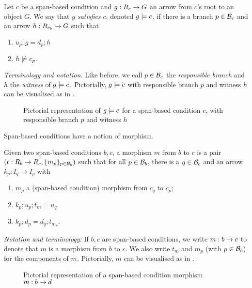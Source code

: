 \begin{definition}
  Let $c$ be a span-based condition and $g:R_c\rightarrow G$ an arrow from $c$'s root to an object $G$. We say that \emph{$g$ satisfies $c$}, denoted $g\models c$, if there is a branch $p\in \mathcal{B}_c$ and an arrow $h:R_{c_b}\rightarrow G$ such that
  \begin{enumerate}
  \item $u_p;g=d_p;h$
  \item $h\not\models c_p$.
  \end{enumerate}
\end{definition}
%
\emph{Terminology and notation.} Like before, we call $p\in\mathcal{B}_c$ the \emph{responsible branch} and $h$ the \emph{witness} of $g\models c$. Pictorially, $g\models c$ with responsible branch $p$ and witness $h$ can be visualised as in .
%
\begin{figure}
  \centering
  
  \caption{Pictorial representation of $g\models c$ for a span-based condition $c$, with responsible branch $p$ and witness $h$}
\end{figure}

\medskip\noindent
Span-based conditions have a notion of morphism.

\begin{definition}
  Given two span-based conditions $b,c$, a morphism $m$ from $b$ to $c$ is a pair $(t:R_b\rightarrow R_c,\{{m_p}\}_{p\in \mathcal{B}_b})$ such that for all $p\in \mathcal{B}_b$, there is a $q\in \mathcal{B}_c$ and an arrow $k_p:I_q\rightarrow I_p$ with
  \begin{enumerate}
  \item $m_p$ a (span-based condition) morphism from $c_q$ to $c_p$;
  \item $k_p;u_p;t_m=u_q$.
  \item $k_p;d_p=d_q;t_{m_p}$.
  \end{enumerate}
\end{definition}
%
\emph{Notation and terminology:} If $b,c$ are span-based conditions, we write $m:b\rightarrow c$ to denote that $m$ is a morphism from $b$ to $c$. We also write $t_m$ and $m_p$ (with $p\in\mathcal{B}_b$) for the components of $m$. Pictorially, $m$ can be visualised as in .
%
\begin{figure}
  \centering
  
  \caption{Pictorial representation of a span-based condition morphism $m:b\rightarrow d$}
\end{figure}

